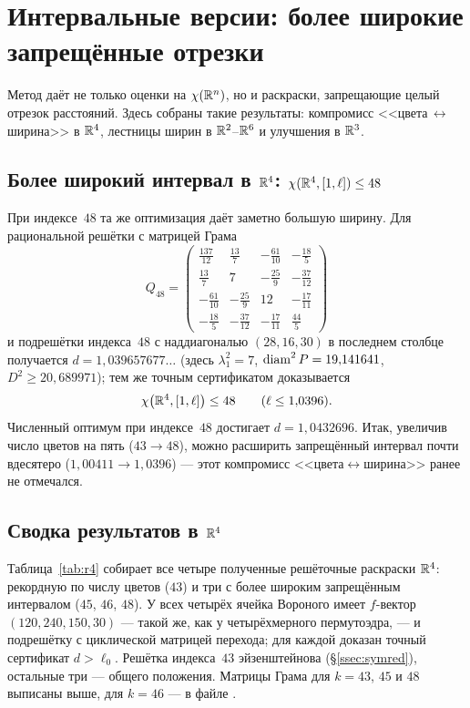 \section{Интервальные версии: более широкие запрещённые отрезки}
\label{sec:wide}

Метод даёт не только оценки на $\chi(\mathbb{R}^n)$, но и раскраски, запрещающие целый
отрезок расстояний. Здесь собраны такие результаты: компромисс
<<цвета\,$\leftrightarrow$\,ширина>> в $\mathbb{R}^4$, лестницы ширин в $\mathbb{R}^2$--$\mathbb{R}^6$ и
улучшения в $\mathbb{R}^3$.

\subsection{Более широкий интервал в $\mathbb{R}^4$: $\chi(\mathbb{R}^4,[1,\ell])\le48$}


При индексе~$48$ та же оптимизация даёт заметно большую ширину. Для рациональной
решётки с матрицей Грама
\[
Q_{48}=\begin{pmatrix}
\tfrac{137}{12}&\tfrac{13}{7}&-\tfrac{61}{10}&-\tfrac{18}{5}\\[2pt]
\tfrac{13}{7}&7&-\tfrac{25}{9}&-\tfrac{37}{12}\\[2pt]
-\tfrac{61}{10}&-\tfrac{25}{9}&12&-\tfrac{17}{11}\\[2pt]
-\tfrac{18}{5}&-\tfrac{37}{12}&-\tfrac{17}{11}&\tfrac{44}{5}
\end{pmatrix}
\]
и подрешётки индекса~$48$ с наддиагональю $(28,16,30)$ в последнем столбце
получается $d=1{,}039657677\ldots$ (здесь $\lambda_1^2=7$,
$\operatorname{diam}^2P=19{,}141641$, $D^2\ge20{,}689971$); тем же точным сертификатом
доказывается
\[
\chi\bigl(\mathbb{R}^4,[1,\ell]\bigr)\le48\qquad(\ell\le1{,}0396).
\]
Численный оптимум при индексе~$48$ достигает $d=1{,}0432696$. Итак, увеличив
число цветов на пять ($43\to48$), можно расширить запрещённый интервал почти
вдесятеро ($1{,}00411\to1{,}0396$) --- этот компромисс
<<цвета${}\leftrightarrow{}$ширина>> ранее не отмечался.

\subsection{Сводка результатов в $\mathbb{R}^4$}

Таблица~\ref{tab:r4} собирает все четыре полученные решёточные раскраски
$\mathbb{R}^4$: рекордную по числу цветов ($43$) и три с более широким запрещённым
интервалом ($45$, $46$, $48$). У всех четырёх ячейка Вороного имеет $f$-вектор
$(120,240,150,30)$ --- такой же, как у четырёхмерного пермутоэдра, --- и
подрешётку с циклической матрицей перехода; для каждой доказан точный
сертификат $d>\ell_0$. Решётка индекса~$43$ эйзенштейнова
(\S\ref{ssec:symred}), остальные три --- общего положения. Матрицы Грама для
$k=43$, $45$ и $48$ выписаны выше, для $k=46$ --- в файле
.

